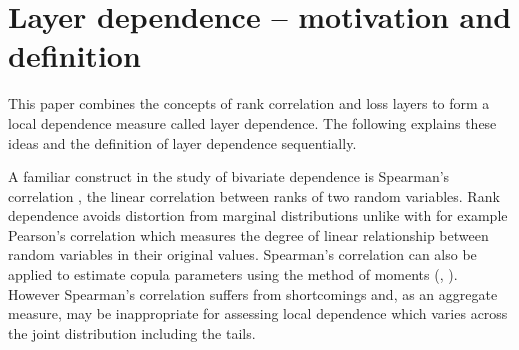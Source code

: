 \documentclass[authoryear]{elsarticle}
\begin{document}

\section{Layer dependence -- motivation and definition}\label{sintroduction}


This paper combines the concepts of rank correlation and loss layers to form a local dependence measure called layer dependence. The following explains these ideas and the definition of layer dependence sequentially.


A familiar construct in the study of bivariate dependence is Spearman's correlation \citep{embrechts2002correlation}, the linear correlation between ranks of two random variables. Rank dependence avoids distortion from marginal distributions unlike with for example Pearson's correlation \citep{mcneil2005qrm} which measures the degree of linear relationship between random variables in their original values. Spearman's correlation can also be applied to estimate copula parameters using the method of moments (\cite{kojadinovic2010comparison}, \cite{bouye2000copulas}). However Spearman's correlation suffers from shortcomings and, as an aggregate measure, may be inappropriate for assessing local dependence which varies across the joint distribution including the tails.
\end{document}
